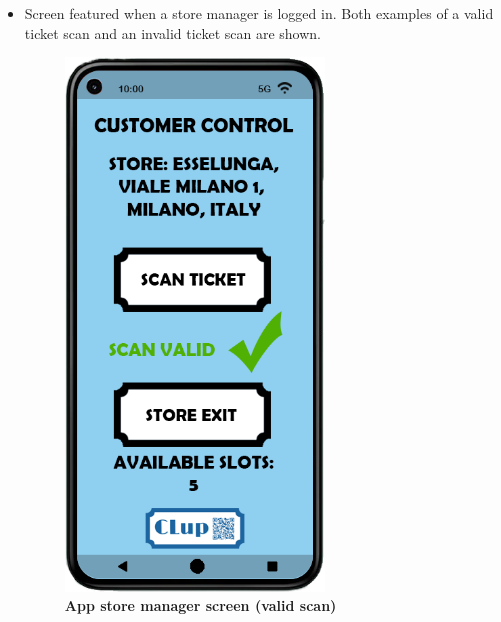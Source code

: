 \begin{itemize}
\item Screen featured when a store manager is logged in. Both examples of a valid ticket scan and an invalid ticket scan are shown.
\begin{figure}[!htb]
\centering
\begin{minipage}{0.4\textwidth}
\centering
\includegraphics[width=0.65\textwidth]{Images/App/Android_ValidScan}
\caption{\label{fig:androidvalidscan}\textbf{App store manager screen (valid scan)}}
\end{minipage}
\begin{minipage}{0.4\textwidth}
\centering

\end{minipage}
\end{figure}
\end{itemize}
